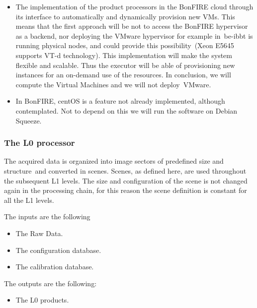 \documentclass[a4paper]{article}
\newcommand\liststyleLFOxxx{%
\renewcommand\labelitemi{[F0B7?]}
\renewcommand\labelitemii{o}
\renewcommand\labelitemiii{[F0A7?]}
\renewcommand\labelitemiv{[F0B7?]}
}
\newcommand\liststyleLFOxxxii{%
\renewcommand\labelitemi{[F0B7?]}
\renewcommand\labelitemii{o}
\renewcommand\labelitemiii{[F0B7?]}
\renewcommand\labelitemiv{[F0B7?]}
}
\begin{document}
\liststyleLFOxxx
\begin{itemize}
\item The implementation of the product processors in the BonFIRE cloud
through its interface to automatically and dynamically provision new
VMs. This means that the first approach will be not to access the
BonFIRE hypervisor as a backend, nor deploying the VMware hypervisor
for example in\ be-ibbt is running physical nodes, and could provide
this possibility\ (Xeon E5645 supports VT-d technology). This
implementation will make the system flexible and scalable. Thus the
executor will be able of provisioning new instances for an on-demand
use of the resources. In conclusion, we will compute the Virtual
Machines and we will not deploy\ VMware.\ 
\item In BonFIRE, centOS is a feature not already implemented, although
contemplated. Not to depend on this we will run the software on Debian
Squeeze.
\end{itemize}

\bigskip

\subsubsection[The L0 processor]{The L0 processor}
\hypertarget{Toc381777213}{}
\bigskip

The acquired data is organized into image sectors of predefined size and
structure\ and converted in scenes. Scenes, as defined here, are used
throughout the subsequent L1 levels. The size and configuration of the
scene is not changed again in the processing chain, for this reason the
scene definition is constant for all the L1 levels.


\bigskip

The inputs are the following

\liststyleLFOxxxii
\begin{itemize}
\item The Raw Data.
\item The configuration database.
\item The calibration database.
\end{itemize}

\bigskip

The outputs are the following:

\liststyleLFOxxxii
\begin{itemize}
\item The L0 products.
\end{itemize}
\end{document}

